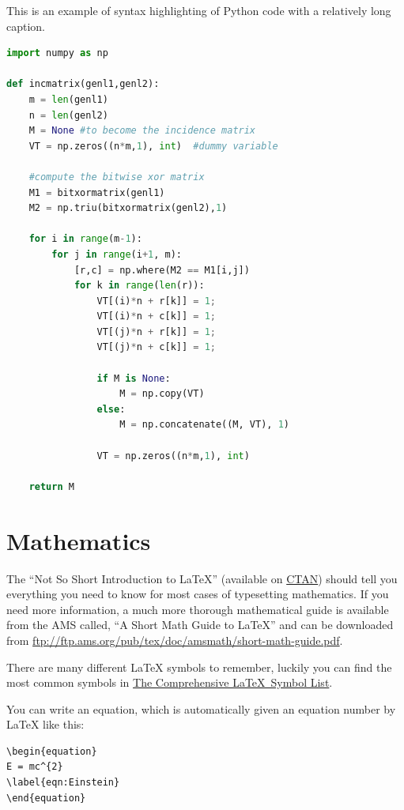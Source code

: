 \begin{lstfloat}
\caption{\label{lst:listing} This is an example of syntax highlighting of Python code with a relatively long caption.}
\begin{lstlisting}[language=Python]
import numpy as np
 
def incmatrix(genl1,genl2):
    m = len(genl1)
    n = len(genl2)
    M = None #to become the incidence matrix
    VT = np.zeros((n*m,1), int)  #dummy variable
 
    #compute the bitwise xor matrix
    M1 = bitxormatrix(genl1)
    M2 = np.triu(bitxormatrix(genl2),1) 
 
    for i in range(m-1):
        for j in range(i+1, m):
            [r,c] = np.where(M2 == M1[i,j])
            for k in range(len(r)):
                VT[(i)*n + r[k]] = 1;
                VT[(i)*n + c[k]] = 1;
                VT[(j)*n + r[k]] = 1;
                VT[(j)*n + c[k]] = 1;
 
                if M is None:
                    M = np.copy(VT)
                else:
                    M = np.concatenate((M, VT), 1)
 
                VT = np.zeros((n*m,1), int)
 
    return M
\end{lstlisting}
\end{lstfloat}


\section{Mathematics}

The \enquote{Not So Short Introduction to \LaTeX} (available on \href{http://www.ctan.org/tex-archive/info/lshort/english/lshort.pdf}{CTAN}) should tell you everything you need to know for most cases of typesetting mathematics. If you need more information, a much more thorough mathematical guide is available from the AMS called, \enquote{A Short Math Guide to \LaTeX} and can be downloaded from
\url{ftp://ftp.ams.org/pub/tex/doc/amsmath/short-math-guide.pdf}.

There are many different LaTeX symbols to remember, luckily you can find the most common symbols in \href{http://ctan.org/pkg/comprehensive}{The Comprehensive \LaTeX~Symbol List}.

You can write an equation, which is automatically given an equation number by LaTeX like this:
\begin{lstlisting}[language={[LaTeX]TeX}]
\begin{equation}
E = mc^{2}
\label{eqn:Einstein}
\end{equation}
\end{lstlisting}

